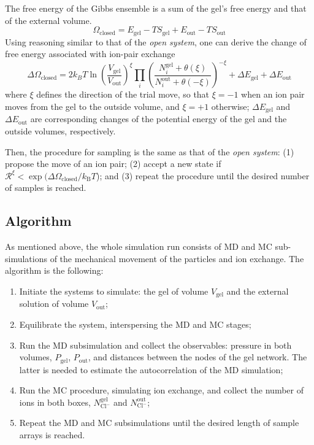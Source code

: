 \documentclass[gels,article,accept,pdftex,moreauthors]{Definitions/mdpi}
\newcommand{\kT}{k_\mathrm{B}T}
\newcommand{\Ncl}{N_\mathrm{Cl^-}}
\newcommand{\gel}{^\mathrm{gel}}
\newcommand{\out}{^{\mathrm{out}}}
\newcommand{\Vgel}{V_\mathrm{gel}}
\newcommand{\Egel}{E_\mathrm{gel}}
\newcommand{\Sgel}{S_\mathrm{gel}}
\newcommand{\Vout}{V_\mathrm{out}}
\newcommand{\Eout}{E_\mathrm{out}}
\newcommand{\Sout}{S_\mathrm{out}}
\begin{document}
The free energy of the Gibbs ensemble is a sum of the gel's free energy and that of the external volume.
\begin{equation}
    \Omega_{\mathrm{closed}}=\Egel-T\Sgel + \Eout-T\Sout \label{eq:Omega-GC}
\end{equation}
Using reasoning similar to that of the \emph{open system}, one can derive the change of free energy associated with ion-pair exchange 
\begin{equation}
\Delta \Omega_{\mathrm{closed}} =2 k_B T \ln \left(\frac{\Vgel}{\Vout} \right) ^ {\xi}\prod_i \left(\frac{N_{i}\gel+\theta(\xi)}{N_{i}\out+\theta(-\xi)}\right)^{-\xi} + \Delta \Egel + \Delta \Eout
\end{equation}
where $\xi$ defines the direction of the trial move, so that $\xi = -1$ when an ion pair moves from the gel to the outside volume, and  $\xi = +1$ otherwise; $\Delta \Egel$ and $\Delta \Eout$ are corresponding changes of the potential energy of the gel and the outside volumes, respectively.

Then, the procedure for sampling is the same as that of the \emph{open system}: (1) propose the move of an ion pair; (2) accept a new state if $\mathcal{R}^{\xi}<\exp({\Delta\Omega_\mathrm{closed}/\kT}$); and (3) repeat the procedure until the desired number of samples is reached.

\subsection{Algorithm}
As mentioned above, the whole simulation run consists of MD and MC sub-simulations of the mechanical movement of the particles and ion exchange. The algorithm is the following:
\begin{enumerate}
\item Initiate the systems to simulate: the gel of volume $\Vgel$ and the external solution of volume $\Vout$;
\item Equilibrate the system, interspersing the MD and MC stages;
\item Run the MD subsimulation and collect the observables: pressure in both volumes, $P_\mathrm{gel}$, $P_\mathrm{out}$, and distances between the nodes of the gel network. The latter is needed to estimate the autocorrelation of the MD simulation;
\item Run the MC procedure, simulating ion exchange, and collect the number of ions in both boxes, 
$\Ncl\gel$ and $\Ncl\out$; 
\item Repeat the MD and MC subsimulations until the desired length of sample arrays is reached.
\end{enumerate}
\end{document}

